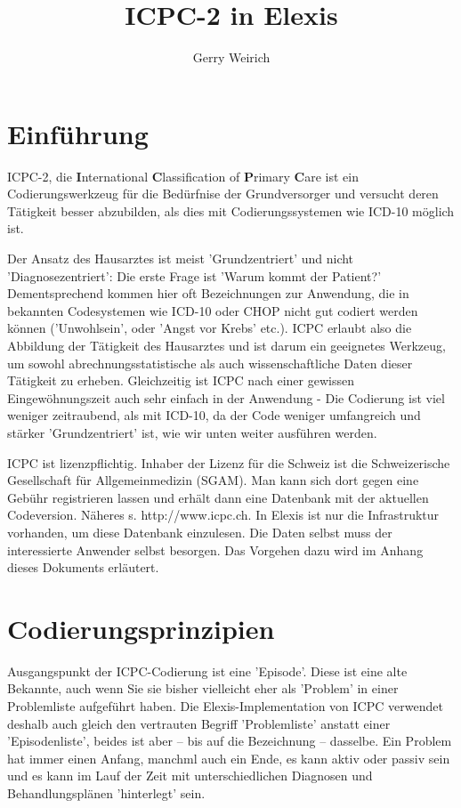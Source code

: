 \documentclass[a4paper]{scrartcl}
\begin{document}
\title{ICPC-2 in Elexis}
\author{Gerry Weirich}
\maketitle

\section{Einführung}
ICPC-2, die \textbf{I}nternational \textbf{C}lassification of \textbf{P}rimary \textbf{C}are ist ein Codierungswerkzeug für die Bedürfnise der Grundversorger und versucht deren Tätigkeit besser abzubilden, als dies mit Codierungssystemen wie ICD-10 möglich ist.

\medskip

Der Ansatz des Hausarztes ist meist 'Grundzentriert' und nicht 'Diagnosezentriert': Die erste Frage ist 'Warum kommt der Patient?' Dementsprechend kommen hier oft Bezeichnungen zur Anwendung, die in bekannten Codesystemen wie ICD-10 oder CHOP nicht gut codiert werden können ('Unwohlsein', oder 'Angst vor Krebs' etc.). ICPC erlaubt also die Abbildung der Tätigkeit des Hausarztes und ist darum ein geeignetes Werkzeug, um sowohl abrechnungsstatistische als auch wissenschaftliche Daten dieser Tätigkeit zu erheben. Gleichzeitig ist ICPC nach einer gewissen Eingewöhnungszeit auch sehr einfach in der Anwendung - Die Codierung ist viel weniger zeitraubend, als mit ICD-10, da der Code weniger umfangreich und stärker 'Grundzentriert' ist, wie wir unten weiter ausführen werden.

\medskip
ICPC ist lizenzpflichtig. Inhaber der Lizenz für die Schweiz ist die Schweizerische Gesellschaft für Allgemeinmedizin (SGAM). Man kann sich dort gegen eine Gebühr registrieren lassen und erhält dann eine Datenbank mit der aktuellen Codeversion. Näheres s. http://www.icpc.ch. In Elexis ist nur die Infrastruktur vorhanden, um diese Datenbank einzulesen. Die Daten selbst muss der interessierte Anwender selbst besorgen. Das Vorgehen dazu wird im Anhang dieses Dokuments erläutert.

\section{Codierungsprinzipien}
 Ausgangspunkt der ICPC-Codierung ist eine 'Episode'. Diese ist eine alte Bekannte, auch wenn Sie sie bisher vielleicht eher als 'Problem' in einer Problemliste aufgeführt haben. Die Elexis-Implementation von ICPC verwendet deshalb auch gleich den vertrauten Begriff 'Problemliste' anstatt einer 'Episodenliste', beides ist aber -- bis auf die Bezeichnung -- dasselbe. Ein Problem hat immer einen Anfang, manchml auch ein Ende, es kann aktiv oder passiv sein und es kann im Lauf der Zeit mit unterschiedlichen Diagnosen und Behandlungsplänen 'hinterlegt' sein.
\end{document}
